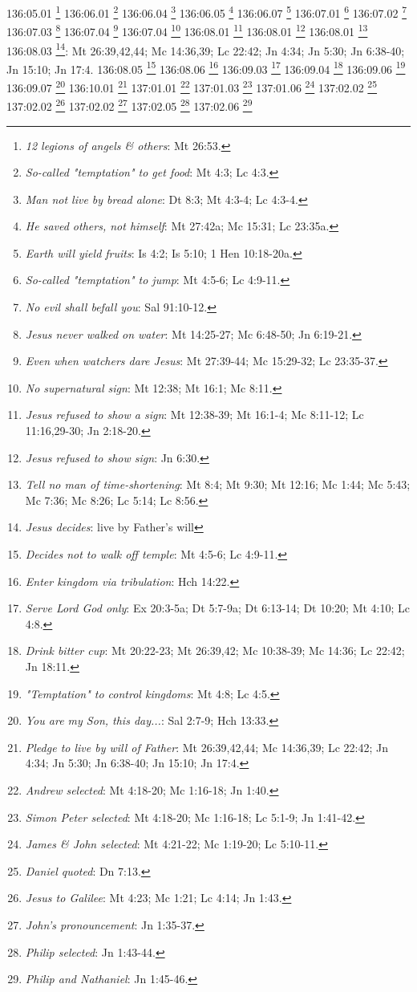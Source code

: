 {{{{{{{{{136:05.01 \footnote{\textit{12 legions of angels & others}: Mt 26:53.}
136:06.01 \footnote{\textit{So-called "temptation" to get food}: Mt 4:3; Lc 4:3.}
136:06.04 \footnote{\textit{Man not live by bread alone}: Dt 8:3; Mt 4:3-4; Lc 4:3-4.}
136:06.05 \footnote{\textit{He saved others, not himself}: Mt 27:42a; Mc 15:31; Lc 23:35a.}
136:06.07 \footnote{\textit{Earth will yield fruits}: Is 4:2; Is 5:10; 1 Hen 10:18-20a.}
136:07.01 \footnote{\textit{So-called "temptation" to jump}: Mt 4:5-6; Lc 4:9-11.}
136:07.02 \footnote{\textit{No evil shall befall you}: Sal 91:10-12.}
136:07.03 \footnote{\textit{Jesus never walked on water}: Mt 14:25-27; Mc 6:48-50; Jn 6:19-21.}
136:07.04 \footnote{\textit{Even when watchers dare Jesus}: Mt 27:39-44; Mc 15:29-32; Lc 23:35-37.}
136:07.04 \footnote{\textit{No supernatural sign}: Mt 12:38; Mt 16:1; Mc 8:11.}
136:08.01 \footnote{\textit{Jesus refused to show a sign}: Mt 12:38-39; Mt 16:1-4; Mc 8:11-12; Lc 11:16,29-30; Jn 2:18-20.}
136:08.01 \footnote{\textit{Jesus refused to show sign}: Jn 6:30.}
136:08.01 \footnote{\textit{Tell no man of time-shortening}: Mt 8:4; Mt 9:30; Mt 12:16; Mc 1:44; Mc 5:43; Mc 7:36; Mc 8:26; Lc 5:14; Lc 8:56.}
136:08.03 \footnote{\textit{Jesus decides}: live by Father's will}: Mt 26:39,42,44; Mc 14:36,39; Lc 22:42; Jn 4:34; Jn 5:30; Jn 6:38-40; Jn 15:10; Jn 17:4.}
136:08.05 \footnote{\textit{Decides not to walk off temple}: Mt 4:5-6; Lc 4:9-11.}
136:08.06 \footnote{\textit{Enter kingdom via tribulation}: Hch 14:22.}
136:09.03 \footnote{\textit{Serve Lord God only}: Ex 20:3-5a; Dt 5:7-9a; Dt 6:13-14; Dt 10:20; Mt 4:10; Lc 4:8.}
136:09.04 \footnote{\textit{Drink bitter cup}: Mt 20:22-23; Mt 26:39,42; Mc 10:38-39; Mc 14:36; Lc 22:42; Jn 18:11.}
136:09.06 \footnote{\textit{"Temptation" to control kingdoms}: Mt 4:8; Lc 4:5.}
136:09.07 \footnote{\textit{You are my Son, this day...}: Sal 2:7-9; Hch 13:33.}
136:10.01 \footnote{\textit{Pledge to live by will of Father}: Mt 26:39,42,44; Mc 14:36,39; Lc 22:42; Jn 4:34; Jn 5:30; Jn 6:38-40; Jn 15:10; Jn 17:4.}
137:01.01 \footnote{\textit{Andrew selected}: Mt 4:18-20; Mc 1:16-18; Jn 1:40.}
137:01.03 \footnote{\textit{Simon Peter selected}: Mt 4:18-20; Mc 1:16-18; Lc 5:1-9; Jn 1:41-42.}
137:01.06 \footnote{\textit{James & John selected}: Mt 4:21-22; Mc 1:19-20; Lc 5:10-11.}
137:02.02 \footnote{\textit{Daniel quoted}: Dn 7:13.}
137:02.02 \footnote{\textit{Jesus to Galilee}: Mt 4:23; Mc 1:21; Lc 4:14; Jn 1:43.}
137:02.02 \footnote{\textit{John's pronouncement}: Jn 1:35-37.}
137:02.05 \footnote{\textit{Philip selected}: Jn 1:43-44.}
137:02.06 \footnote{\textit{Philip and Nathaniel}: Jn 1:45-46.}
}}}}}}}}
